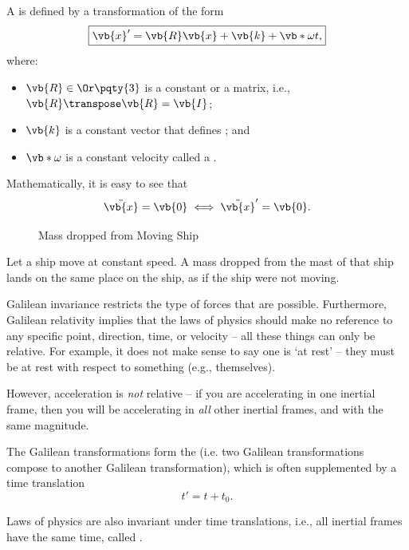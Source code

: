 \begin{definition}
    \label{def:galilean-transformation}%
    A  is defined by a transformation of the form
    \begin{equation}
        \boxed{\vb{x}' = \vb{R} \vb{x} + \vb{k} + \vb*{\omega} t,}
    \end{equation}
    where:
    \begin{itemize}
        \item \(\vb{R} \in \Or\pqty{3}\) is a constant  or a  matrix, i.e., \(\vb{R} \transpose \vb{R} = \vb{I}\);
        \item \(\vb{k}\) is a constant vector that defines ; and
        \item \(\vb*{\omega}\) is a constant velocity called a .
    \end{itemize}
\end{definition}

Mathematically, it is easy to see that
\begin{equation}
    \ddot{\vb{x}} = \vb{0} \iff \ddot{\vb{x}}' = \vb{0}.
\end{equation}

\begin{figure}[ht!]
    \centering
    \caption{Mass dropped from Moving Ship}
    \label{fig:mass-dropped-from-moving-ship}%
\end{figure}

\begin{example}
    \label{ex:mass-dropped-from-moving-ship}%
    Let a ship move at constant speed. A mass dropped from the mast of that ship lands on the same place on the ship, as if the ship were not moving.
\end{example}

Galilean invariance restricts the type of forces that are possible. Furthermore, Galilean relativity implies that the laws of physics should make no reference to any specific point, direction, time, or velocity -- all these things can only be relative. For example, it does not make sense to say one is `at rest' -- they must be at rest with respect to something (e.g., themselves).

However, acceleration is \emph{not} relative -- if you are accelerating in one inertial frame, then you will be accelerating in \emph{all} other inertial frames, and with the same magnitude.

The Galilean transformations form the  (i.e. two Galilean transformations compose to another Galilean transformation), which is often supplemented by a time translation
\begin{equation}
    t' = t + t_0.
\end{equation}

Laws of physics are also invariant under time translations, i.e., all inertial frames have the same time, called .